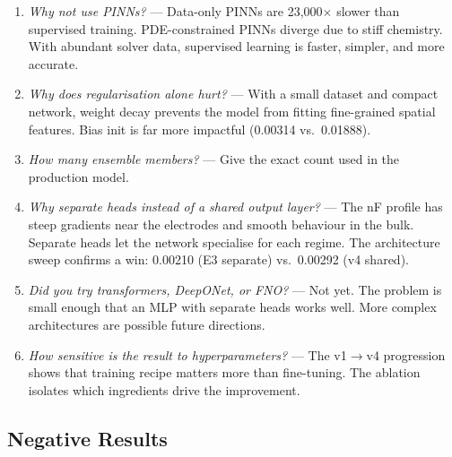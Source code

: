 \documentclass[12pt,a4paper]{article}
\begin{document}
\begin{enumerate}[1.]
  \item \emph{Why not use PINNs?} ---
    Data-only PINNs are 23,000$\times$ slower than supervised
    training. PDE-constrained PINNs diverge due to stiff chemistry.
    With abundant solver data, supervised learning is faster, simpler,
    and more accurate.

  \item \emph{Why does regularisation alone hurt?} ---
    With a small dataset and compact network, weight decay prevents the
    model from fitting fine-grained spatial features. Bias init is far
    more impactful (0.00314 vs.\ 0.01888).

  \item \emph{How many ensemble members?} ---
    Give the exact count used in the production model.

  \item \emph{Why separate heads instead of a shared output layer?} ---
    The nF profile has steep gradients near the electrodes and smooth
    behaviour in the bulk. Separate heads let the network specialise
    for each regime. The architecture sweep confirms a win:
    0.00210 (E3 separate) vs.\ 0.00292 (v4 shared).

  \item \emph{Did you try transformers, DeepONet, or FNO?} ---
    Not yet. The problem is small enough that an MLP with separate
    heads works well. More complex architectures are possible future
    directions.

  \item \emph{How sensitive is the result to hyperparameters?} ---
    The v1$\to$v4 progression shows that training recipe matters more
    than fine-tuning. The ablation isolates which ingredients drive the
    improvement.
\end{enumerate}

\subsection*{Negative Results}
\end{document}
